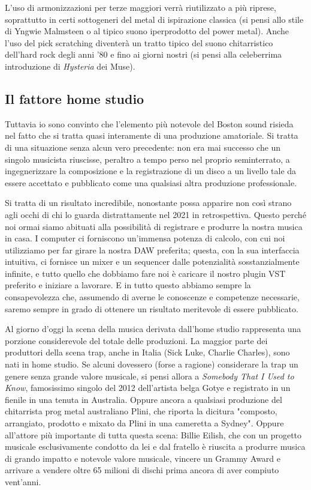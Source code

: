 \documentclass[class=book, crop=false, oneside, 12pt]{standalone}
\begin{document}
L'uso di armonizzazioni per terze maggiori verrà riutilizzato a più riprese, soprattutto in certi sottogeneri del metal di ispirazione classica (si pensi allo stile di Yngwie Malmsteen o al tipico suono iperprodotto del power metal). Anche l'uso del pick scratching diventerà un tratto tipico del suono chitarristico dell'hard rock degli anni '80 e fino ai giorni nostri (si pensi alla celeberrima introduzione di \emph{Hysteria} dei Muse).

\subsection{Il fattore home studio}
Tuttavia io sono convinto che l'elemento più notevole del Boston sound risieda nel fatto che si tratta quasi interamente di una produzione amatoriale. Si tratta di una situazione senza alcun vero precedente: non era mai successo che un singolo musicista riuscisse, peraltro a tempo perso nel proprio seminterrato, a ingegnerizzare la composizione e la registrazione di un disco a un livello tale da essere accettato e pubblicato come una qualsiasi altra produzione professionale. 

Si tratta di un risultato incredibile, nonostante possa apparire non così strano agli occhi di chi lo guarda distrattamente nel 2021 in retrospettiva. Questo perché noi ormai siamo abituati alla possibilità di registrare e produrre la nostra musica in casa. I computer ci forniscono un'immensa potenza di calcolo, con cui noi utilizziamo per far girare la nostra DAW preferita; questa, con la sua interfaccia intuitiva, ci fornisce un mixer e un sequencer dalle potenzialità sosstanzialmente infinite, e tutto quello che dobbiamo fare noi è caricare il nostro plugin VST preferito e iniziare a lavorare. E in tutto questo abbiamo sempre la consapevolezza che, assumendo di averne le conoscenze e competenze necessarie, saremo sempre in grado di ottenere un risultato meritevole di essere pubblicato. 

Al giorno d'oggi la scena della musica derivata dall'home studio rappresenta una porzione considerevole del totale delle produzioni. La maggior parte dei produttori della scena trap, anche in Italia (Sick Luke, Charlie Charles), sono nati in home studio. Se alcuni dovessero (forse a ragione) considerare la trap un genere senza grande valore musicale, si pensi allora a \emph{Somebody That I Used to Know}, famosissimo singolo del 2012 dell'artista belga Gotye e registrato in un fienile in una tenuta in Australia. Oppure ancora a qualsiasi produzione del chitarrista prog metal australiano Plini, che riporta la dicitura "composto, arrangiato, prodotto e mixato da Plini in una cameretta a Sydney"\cite{yt:plini}. Oppure all'attore più importante di tutta questa scena: Billie Eilish, che con un progetto musicale esclusivamente condotto da lei e dal fratello è riuscita a produrre musica di grando impatto e notevole valore musicale, vincere un Grammy Award e arrivare a vendere oltre 65 milioni di dischi prima ancora di aver compiuto vent'anni.
\end{document}
